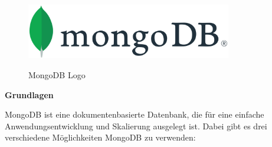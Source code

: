\begin{figure}[h!]
    \centering
    \includegraphics[width=0.8\textwidth]{pics/mongodb.png}
    \caption{MongoDB Logo}
    \cite{database_mongodb_logo}
    \label{fig:enter-label}
\end{figure}

\textbf{Grundlagen}

MongoDB ist eine dokumentenbasierte Datenbank, die für eine einfache Anwendungsentwicklung und Skalierung ausgelegt ist. Dabei gibt es drei verschiedene Möglichkeiten MongoDB zu verwenden: 
